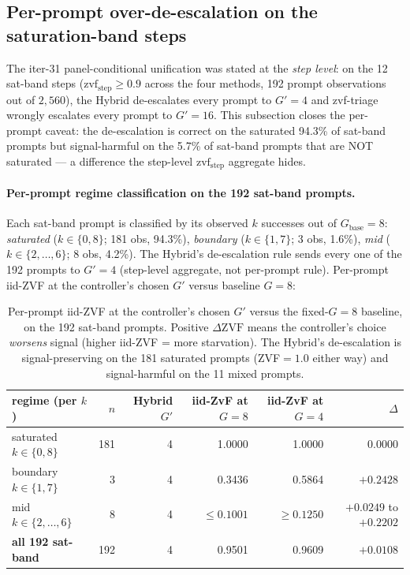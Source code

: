 \documentclass{article}
\begin{document}
\subsection{Per-prompt over-de-escalation on the saturation-band steps}
\label{sec:p7-satband-perprompt}

The iter-31 panel-conditional unification was stated at the
\emph{step level}: on the 12 sat-band steps
($\mathrm{zvf}_\text{step} \ge 0.9$ across the four methods,
192 prompt observations out of $2{,}560$), the Hybrid de-escalates
every prompt to $G'=4$ and zvf-triage wrongly escalates every prompt
to $G'=16$. This subsection closes the per-prompt caveat: the
de-escalation is correct on the saturated 94.3\% of sat-band prompts
but signal-harmful on the 5.7\% of sat-band prompts that are NOT
saturated --- a difference the step-level $\mathrm{zvf}_\text{step}$
aggregate hides.

\paragraph{Per-prompt regime classification on the 192 sat-band
prompts.}
Each sat-band prompt is classified by its observed $k$ successes out of
$G_\text{base}{=}8$: \emph{saturated} ($k \in \{0, 8\}$; 181 obs,
94.3\%), \emph{boundary} ($k \in \{1, 7\}$; 3 obs, 1.6\%),
\emph{mid} ($k \in \{2, \dots, 6\}$; 8 obs, 4.2\%). The Hybrid's
de-escalation rule sends every one of the 192 prompts to $G'=4$
(step-level aggregate, not per-prompt rule). Per-prompt iid-ZVF at
the controller's chosen $G'$ versus baseline $G{=}8$:

\begin{table}[t]
\centering
\caption{Per-prompt iid-ZVF at the controller's chosen $G'$
versus the fixed-$G{=}8$ baseline, on the 192 sat-band prompts.
Positive $\Delta\mathrm{ZVF}$ means the controller's choice \emph{worsens}
signal (higher iid-ZVF = more starvation). The Hybrid's de-escalation
is signal-preserving on the 181 saturated prompts (ZVF$=1.0$ either
way) and signal-harmful on the 11 mixed prompts.}
\label{tab:p7-satband-perprompt}
\begin{tabular}{lrrrrr}
\toprule
regime (per $k$) & $n$ & Hybrid $G'$ & iid-ZvF at $G{=}8$ & iid-ZvF at $G{=}4$ & $\Delta$ \\
\midrule
saturated $k{\in}\{0,8\}$ & 181 & 4 & 1.0000 & 1.0000 & 0.0000 \\
boundary $k{\in}\{1,7\}$  &   3 & 4 & 0.3436 & 0.5864 & $+0.2428$ \\
mid $k{\in}\{2,\ldots,6\}$ & 8 & 4 & $\le 0.1001$ & $\ge 0.1250$ & $+0.0249$ to $+0.2202$ \\
\midrule
\textbf{all 192 sat-band} & 192 & 4 & 0.9501 & 0.9609 & $+0.0108$ \\
\bottomrule
\end{tabular}
\end{table}
\end{document}
